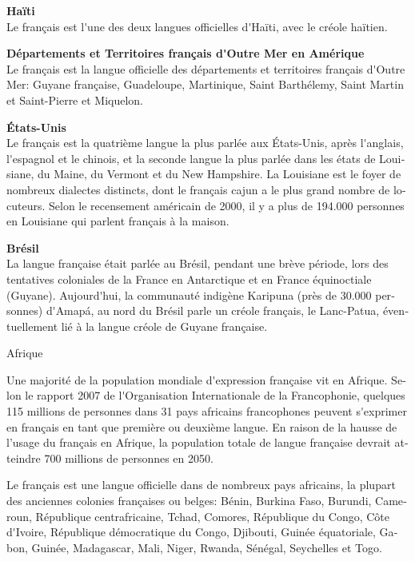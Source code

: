 \begin{french}
\begin{multicols}{2}
{\bf Haïti}\\
Le français est l{\mbox '}une des deux langues officielles d{\mbox
 '}Haïti, avec le créole haïtien.

{\bf Départements et Territoires français d{\mbox '}Outre Mer en Amérique}\\
Le français est la langue officielle des départements et territoires
français d{\mbox '}Outre Mer: Guyane française, Guadeloupe,
Martinique, Saint Barthélemy, Saint Martin et Saint-Pierre et
Miquelon.

{\bf États-Unis}\\
Le français est la quatrième langue la plus parlée aux États-Unis,
après l{\mbox '}anglais, l{\mbox '}espagnol et le chinois, et la
seconde langue la plus parlée dans les états de Louisiane, du Maine,
du Vermont et du New Hampshire. La Louisiane est le foyer de nombreux
dialectes distincts, dont le français cajun a le plus grand nombre de
locuteurs. Selon le recensement américain de 2000, il y a plus de
194.000 personnes en Louisiane qui parlent français à la maison.

{\bf Brésil}\\
La langue française était parlée au Brésil, pendant une brève période,
lors des tentatives coloniales de la France en Antarctique et en
France équinoctiale (Guyane). Aujourd{\mbox '}hui, la communauté indigène
Karipuna (près de 30.000 personnes) d{\mbox '}Amapá, au nord du Brésil
parle un créole français, le Lanc-Patua, éventuellement lié à la
langue créole de Guyane française.

\begin{center}
{\sc Afrique}
\end{center}

Une majorité de la population mondiale d{\mbox '}expression française
vit en Afrique. Selon le rapport 2007 de l{\mbox '}Organisation
Internationale de la Francophonie, quelques 115 millions de personnes
dans 31 pays africains francophones peuvent s{\mbox '}exprimer en
français en tant que première ou deuxième langue. En raison de la
hausse de l'usage du français en Afrique, la population totale de langue
française devrait atteindre 700 millions de personnes en 2050.

Le français est une langue officielle dans de nombreux pays africains,
la plupart des anciennes colonies françaises ou belges: Bénin, Burkina
Faso, Burundi, Cameroun, République centrafricaine, Tchad, Comores,
République du Congo, Côte d{\mbox '}Ivoire, République démocratique du
Congo, Djibouti, Guinée équatoriale, Gabon, Guinée, Madagascar, Mali,
Niger, Rwanda, Sénégal, Seychelles et Togo.


\end{multicols}
\end{french}
